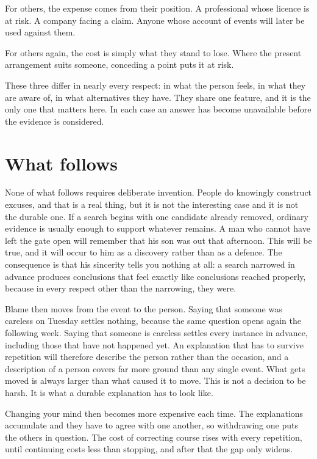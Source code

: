 \documentclass{article}
\begin{document}
For others, the expense comes from their position. A professional whose licence is at risk. A company facing a claim. Anyone whose account of events will later be used against them.

For others again, the cost is simply what they stand to lose. Where the present arrangement suits someone, conceding a point puts it at risk.

These three differ in nearly every respect: in what the person feels, in what they are aware of, in what alternatives they have. They share one feature, and it is the only one that matters here. In each case an answer has become unavailable before the evidence is considered.

\section{What follows}
None of what follows requires deliberate invention. People do knowingly construct excuses, and that is a real thing, but it is not the interesting case and it is not the durable one. If a search begins with one candidate already removed, ordinary evidence is usually enough to support whatever remains. A man who cannot have left the gate open will remember that his son was out that afternoon. This will be true, and it will occur to him as a discovery rather than as a defence. The consequence is that his sincerity tells you nothing at all: a search narrowed in advance produces conclusions that feel exactly like conclusions reached properly, because in every respect other than the narrowing, they were.

Blame then moves from the event to the person. Saying that someone was careless on Tuesday settles nothing, because the same question opens again the following week. Saying that someone is careless settles every instance in advance, including those that have not happened yet. An explanation that has to survive repetition will therefore describe the person rather than the occasion, and a description of a person covers far more ground than any single event. What gets moved is always larger than what caused it to move. This is not a decision to be harsh. It is what a durable explanation has to look like.

Changing your mind then becomes more expensive each time. The explanations accumulate and they have to agree with one another, so withdrawing one puts the others in question. The cost of correcting course rises with every repetition, until continuing costs less than stopping, and after that the gap only widens.
\end{document}
